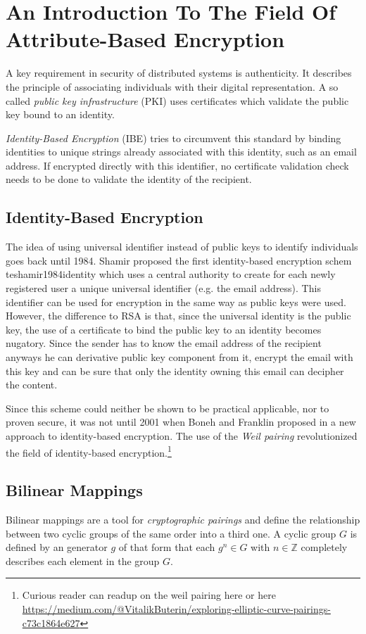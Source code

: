 \section{An Introduction To The Field Of Attribute-Based Encryption}
A key requirement in security of distributed systems is authenticity. It describes the principle of associating individuals with their digital representation. A so called \textit{public key infrastructure} (\ac{PKI}) uses certificates which validate the public key bound to an identity.

\textit{Identity-Based Encryption} (\ac{IBE}) tries to circumvent this standard by binding identities to unique strings already associated with this identity, such as an email address. If encrypted directly with this identifier, no certificate validation check needs to be done to validate the identity of the recipient. 

\subsection{Identity-Based Encryption}
The idea of using universal identifier instead of public keys to identify individuals goes back until 1984. Shamir proposed the first identity-based encryption schem 	te{shamir1984identity} which uses a central authority to create for each newly registered user a unique universal identifier (e.g. the email address). This identifier can be used for encryption in the same way as public keys were used. However, the difference to \ac{RSA} is that, since the universal identity is the public key, the use of a certificate to bind the public key to an identity becomes nugatory. 
Since the sender has to know the email address of the recipient anyways he can derivative public key component from it, encrypt the email with this key and can be sure that only the identity owning this email can decipher the content. 

Since this scheme could neither be shown to be practical applicable, nor to proven secure, it was not until 2001 when Boneh and Franklin proposed in \cite{boneh2001identity} a new approach to identity-based encryption. The use of the \textit{Weil pairing} revolutionized the field of identity-based encryption.\footnote{Curious reader can readup on the weil pairing here \cite{Miller2004} \cite{galbraith2008pairings} or here \url{https://medium.com/@VitalikButerin/exploring-elliptic-curve-pairings-c73c1864e627}}

\subsection{Bilinear Mappings}
\label{sec:bilinearmappings}
Bilinear mappings are a tool for \textit{cryptographic pairings} and define the relationship between two cyclic groups of the same order into a third one. A cyclic group $G$ is defined by an generator $g$ of that form that each $g^n \in G$ with $n \in \mathbb{Z}$ completely describes each element in the group $G$.

